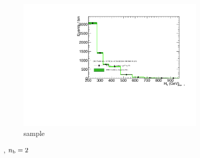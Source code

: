 \begin{figure}[h!]
\begin{subfigure}[b]{0.48\textwidth}
    \includegraphics[width=\textwidth,page=4]
    {Figs/results/v0/greenBand/bestFit_2012dev_RQcdZero_fZinvAll_2b_le3j-1_smOnly}
    \caption{\mj sample}
  \end{subfigure}
  \caption{\njlow, $n_{\text{b}} = 2$}
  \label{fig:green_fits_2b_le3j}
\end{figure}

